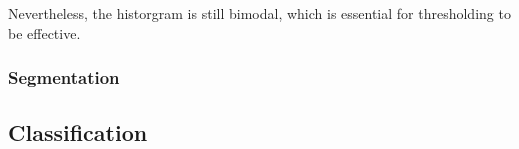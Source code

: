 \documentclass[main.tex]{subfiles}
\begin{document}
Nevertheless, the historgram  is still bimodal, which is essential for thresholding to be effective.

\subsubsection*{Segmentation}



\subsection{Classification}
\end{document}
